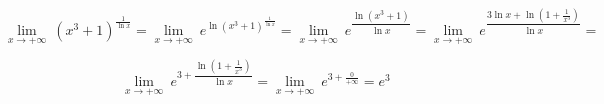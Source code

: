 \documentclass{article}
\begin{document}
    \[\underset{x\to+\infty}{\lim}~\left(x^3+1\right)^{\frac{1}{\ln x}}=
    \underset{x\to+\infty}{\lim}~e^{\ln \left(x^3+1\right)^{\frac{1}{\ln x}}}=
    \underset{x\to+\infty}{\lim}~e^{\dfrac{\ln\left(x^3+1\right)}{\ln x}} =
    \underset{x\to+\infty}{\lim}~e^{\dfrac{3\ln x + \ln\left(1+\frac{1}{x^3}\right)}{\ln x}}=
    \]

    \[\underset{x\to+\infty}{\lim}~e^{3+\dfrac{\ln\left(1+\frac{1}{x^3}\right)}{\ln x}}=
    \underset{x\to+\infty}{\lim}~e^{3+\frac{0}{+\infty}}=e^3
    \]
\end{document}
